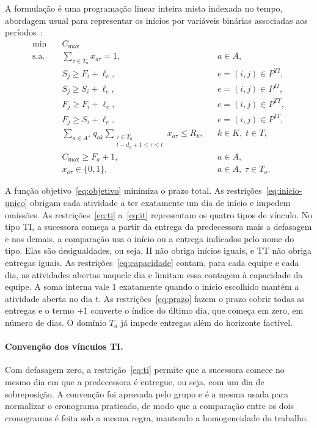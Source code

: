 A formulação é uma programação linear inteira mista indexada no tempo,
abordagem usual para representar os inícios por variáveis binárias
associadas aos períodos~\cite{artigues2017}:
\begin{align}
  \min\quad & C_{\max}
    \label{eq:objetivo}\\
  \text{s.a.}\quad
  & \sum_{\tau\in T_a} x_{a\tau}=1,
    && a\in A,
    \label{eq:inicio-unico}\\
  & S_j \ge F_i+\ell_e,
    && e=(i,j)\in P^{TI},
    \label{eq:ti}\\
  & S_j \ge S_i+\ell_e,
    && e=(i,j)\in P^{II},
    \label{eq:ii}\\
  & F_j \ge F_i+\ell_e,
    && e=(i,j)\in P^{TT},
    \label{eq:tt}\\
  & F_j \ge S_i+\ell_e,
    && e=(i,j)\in P^{IT},
    \label{eq:it}\\
  & \sum_{a\in A^{+}} q_{ak}\!\!
    \sum_{\substack{\tau\in T_a\\ t-d_a+1\le\tau\le t}}\!\! x_{a\tau}
    \le R_k,
    && k\in K,\; t\in T,
    \label{eq:capacidade}\\
  & C_{\max}\ge F_a+1,
    && a\in A,
    \label{eq:prazo}\\
  & x_{a\tau}\in\{0,1\},
    && a\in A,\;\tau\in T_a.
    \label{eq:dominio}
\end{align}

A função objetivo~\eqref{eq:objetivo} minimiza o prazo total. As
restrições~\eqref{eq:inicio-unico} obrigam cada atividade a ter exatamente
um dia de início e impedem omissões. As restrições~\eqref{eq:ti}
a~\eqref{eq:it} representam os quatro tipos de vínculo. No tipo TI, a
sucessora começa a partir da entrega da predecessora mais a defasagem e nos
demais, a comparação usa o início ou a entrega indicados pelo nome do
tipo. Elas são desigualdades, ou seja, II não obriga inícios iguais, e TT não obriga
entregas iguais. As restrições~\eqref{eq:capacidade} contam, para cada
equipe e cada dia, as atividades abertas naquele dia e limitam essa
contagem à capacidade da equipe. A soma interna vale 1 exatamente quando
o início escolhido mantém a atividade aberta no dia $t$. As
restrições~\eqref{eq:prazo} fazem o prazo cobrir todas as entregas e o
termo $+1$ converte o índice do último dia, que começa em zero, em número
de dias. O domínio $T_a$ já impede entregas além do horizonte factível.

\paragraph{Convenção dos vínculos TI.}
Com defasagem zero, a restrição~\eqref{eq:ti} permite que a sucessora
comece no mesmo dia em que a predecessora é entregue, ou seja, com um dia de
sobreposição. A convenção foi aprovada pelo grupo e é a mesma usada para
normalizar o cronograma praticado, de modo que a comparação entre os dois
cronogramas é feita sob a mesma regra, mantendo a homogeneidade do trabalho.

